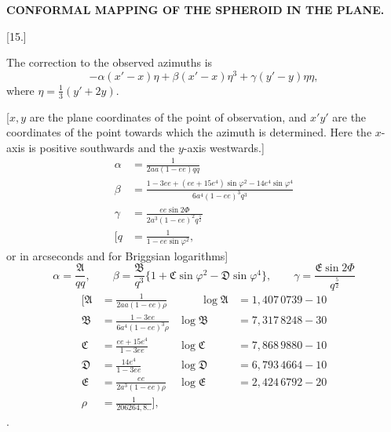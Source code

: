 \par\clearpage
\noindent\null\hfill{\small\textbf{CONFORMAL MAPPING OF THE SPHEROID IN THE PLANE.}}\hfill{}\par\medskip

\begin{center}
[15.]\par{}
\end{center}
The correction to the observed azimuths is
\[
-\alpha(x'-x)\eta+\beta(x'-x)\eta^3+\gamma(y'-y)\eta\eta,
\]
\noindent where \(\eta=\tfrac13(y'+2y)\).

[\(x,y\) are the plane coordinates of the point of observation, and \(x'y'\) are the
coordinates of the point towards which the azimuth is determined. Here the
\(x\)-axis is positive southwards and the \(y\)-axis westwards.]
\[
\begin{aligned}
\alpha&=\frac1{2aa(1-ee)qq}\\
\beta&=\frac{1-3ee+(ee+15e^4)\sin\varphi^2-14e^4\sin\varphi^4}{6a^4(1-ee)^3q^3}\\
\gamma&=\frac{ee\sin2\Phi}{2a^3(1-ee)^2q^{\frac52}}\\
\mathopen{[}q&=\frac1{1-ee\sin\varphi^2},
\end{aligned}
\]
\noindent or in arcseconds and for Briggsian logarithms]
\[
\alpha=\frac{\mathfrak A}{qq},\qquad
\beta=\frac{\mathfrak B}{q^3}\{1+\mathfrak C\sin\varphi^2-\mathfrak D\sin\varphi^4\},\qquad
\gamma=\frac{\mathfrak E\sin2\Phi}{q^{\frac52}}
\]
\[
\begin{alignedat}{2}
{[}\mathfrak A&=\frac1{2aa(1-ee)\rho}
 &\qquad \log\mathfrak A&=1{,}407\,0739-10\\
\mathfrak B&=\frac{1-3ee}{6a^4(1-ee)^3\rho}
 &\log\mathfrak B&=7{,}317\,8248-30\\
\mathfrak C&=\frac{ee+15e^4}{1-3ee}
 &\log\mathfrak C&=7{,}868\,9880-10\\
\mathfrak D&=\frac{14e^4}{1-3ee}
 &\log\mathfrak D&=6{,}793\,4664-10\\
\mathfrak E&=\frac{ee}{2a^3(1-ee)\rho}
 &\log\mathfrak E&=2{,}424\,6792-20\\
\rho&=\frac1{206264{,}8..}\mathclose{]},
\end{alignedat}
\]
\noindent [where the flattening value \(\dfrac1{302{,}68}\) has been used.
\(\alpha,\beta,\gamma\) correspond to the argument
\(\tfrac13(x'+2x)=x+\tfrac13(x'-x)\)].

